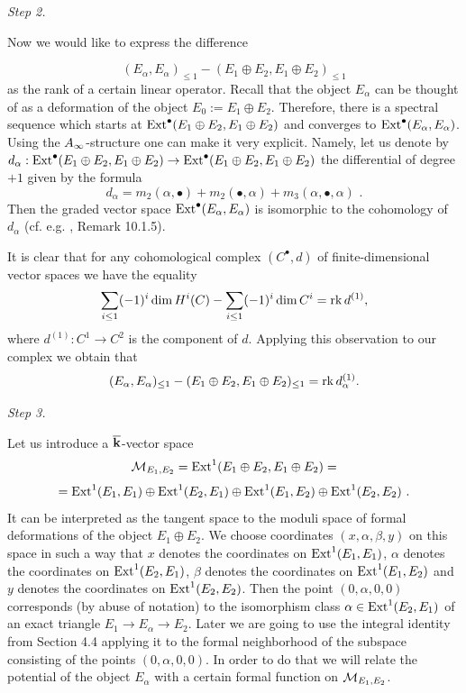 \documentclass[12pt]{article}
\begin{document}
{\it Step 2.}

Now we would like to express the difference

$$(E_{\alpha},E_{\alpha})_{\le 1}-(E_1\oplus E_2,E_1\oplus E_2)_{\le 1}$$ as the rank of a certain linear operator.
Recall that the object $E_{\alpha}$ can be thought of as a deformation of the object $E_0:=E_1\oplus E_2$.
Therefore, there is a spectral sequence which starts at $\operatorname{Ext}^{\bullet}(E_1\oplus E_2,E_1\oplus E_2)$ and converges to
$\operatorname{Ext}^{\bullet}(E_{\alpha},E_{\alpha})$. Using the $A_{\infty}$-structure one can make it very explicit. Namely, let us denote by $d_{\alpha}:\operatorname{Ext}^{\bullet}(E_1\oplus E_2,E_1\oplus E_2)\to \operatorname{Ext}^{\bullet}(E_1\oplus E_2,E_1\oplus E_2) $ the differential of degree $+1$ given by the formula
$$d_{\alpha}=m_2(\alpha,\bullet)+m_2(\bullet,\alpha)+m_3(\alpha,\bullet,\alpha)\,\,.$$
Then the graded vector space $\operatorname{Ext}^{\bullet}(E_{\alpha},E_{\alpha})$ is isomorphic to the cohomology of $d_{\alpha}$
(cf. e.g. \cite{KoSo3}, Remark 10.1.5).

It is clear that for any cohomological complex $(C^{\bullet},d)$ of finite-dimensional vector spaces we have the equality
$$\sum_{i\le 1}(-1)^i\dim H^i(C)-\sum_{i\le 1}(-1)^i\dim C^i
=\operatorname{rk}d^{(1)},$$
where $d^{(1)}: C^1\to C^2$ is the component of $d$. Applying this observation to our complex we obtain that
$$(E_{\alpha},E_{\alpha})_{\le 1}-(E_1\oplus E_2,E_1\oplus E_2)_{\le 1}=\operatorname{rk}d^{(1)}_{\alpha}.$$


















{\it Step 3.}


Let us introduce a ${\overline{\bf k}}$-vector space
$${\cal M}_{E_1,E_2}=\operatorname{Ext}^1(E_1\oplus E_2, E_1\oplus E_2)=$$
$$=\operatorname{Ext}^1(E_1,E_1)\oplus \operatorname{Ext}^1(E_2,E_1)\oplus \operatorname{Ext}^1(E_1,E_2)\oplus \operatorname{Ext}^1(E_2,E_2)\,\,.$$ It can be interpreted as the tangent space to the moduli space of formal deformations of the object $E_1\oplus E_2$.
We choose coordinates $(x,\alpha,\beta,y)$ on this space
in such a way that $x$ denotes the coordinates on $\operatorname{Ext}^1(E_1,E_1)$, $\alpha$ denotes the coordinates on $\operatorname{Ext}^1(E_2,E_1)$, $\beta$ denotes the coordinates on $\operatorname{Ext}^1(E_1,E_2)$ and $y$ denotes the coordinates on $\operatorname{Ext}^1(E_2,E_2)$. Then the point $(0,\alpha,0,0)$ corresponds (by abuse of notation) to the isomorphism class  $\alpha\in \operatorname{Ext}^1(E_2,E_1)$
of an exact triangle $E_1\to E_{\alpha}\to E_2$. Later we are going to use the integral identity from Section 4.4 applying it to the formal neighborhood of the subspace consisting of the points $(0,\alpha,0,0)$. In order to do that we will relate the potential of the object $E_{\alpha}$ with a certain formal function on ${\cal M}_{E_1,E_2}$.
\end{document}
